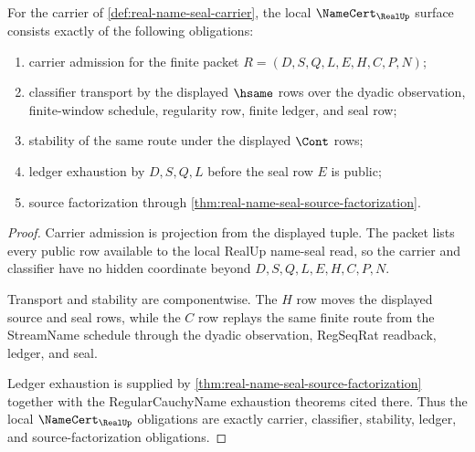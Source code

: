 \begin{theorem}
\label{thm:real-name-seal-namecert-obligations}
For the carrier of \autoref{def:real-name-seal-carrier}, the local $\NameCert_{\RealUp}$ surface consists exactly of the following obligations:
\begin{enumerate}
\item carrier admission for the finite packet $R=(D,S,Q,L,E,H,C,P,N)$;
\item classifier transport by the displayed $\hsame$ rows over the dyadic observation, finite-window schedule, regularity row, finite ledger, and seal row;
\item stability of the same route under the displayed $\Cont$ rows;
\item ledger exhaustion by $D,S,Q,L$ before the seal row $E$ is public;
\item source factorization through \autoref{thm:real-name-seal-source-factorization}.
\end{enumerate}
\end{theorem}
\begin{proof}
Carrier admission is projection from the displayed tuple. The packet lists every public row available to the local RealUp name-seal read, so the carrier and classifier have no hidden coordinate beyond $D,S,Q,L,E,H,C,P,N$.

Transport and stability are componentwise. The $H$ row moves the displayed source and seal rows, while the $C$ row replays the same finite route from the StreamName schedule through the dyadic observation, RegSeqRat readback, ledger, and seal.

Ledger exhaustion is supplied by \autoref{thm:real-name-seal-source-factorization} together with the RegularCauchyName exhaustion theorems cited there. Thus the local $\NameCert_{\RealUp}$ obligations are exactly carrier, classifier, stability, ledger, and source-factorization obligations.
\end{proof}

